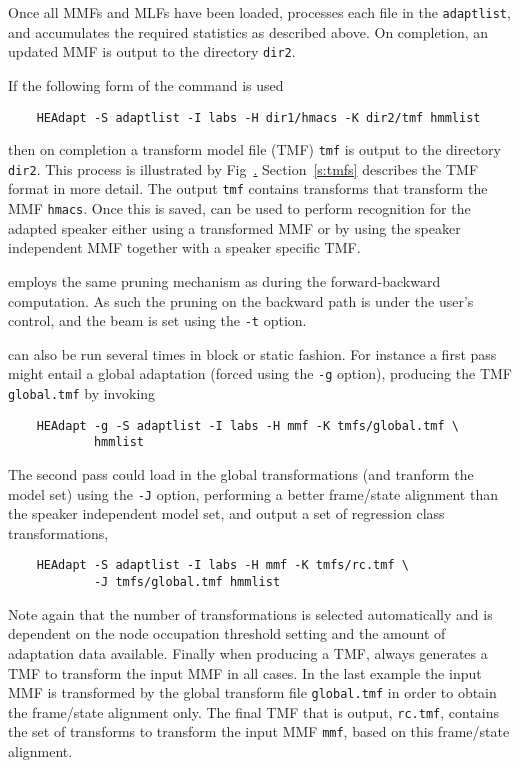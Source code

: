 Once all MMFs and MLFs have been loaded, 
 processes each file in the
\texttt{adaptlist}, and accumulates the required statistics as described
above.  On completion, an updated  MMF is output to the directory
\texttt{dir2}.

If the following form of the command  is used
\begin{verbatim}
    HEAdapt -S adaptlist -I labs -H dir1/hmacs -K dir2/tmf hmmlist
\end{verbatim}
then on completion a transform model file (TMF) \texttt{tmf} is 
output to the directory \texttt{dir2}.
This process is illustrated by Fig~\href{f:headaptrdp}.
Section~\ref{s:tmfs} describes the TMF format in more
detail. The output \texttt{tmf} contains transforms that transform the
MMF \texttt{hmacs}.
Once this is saved,  can be used to perform recognition
for the adapted speaker either using a transformed MMF or by using the
speaker independent MMF together with a speaker specific TMF.

 employs the same pruning mechanism as 
during the forward-backward computation. As such the pruning on the
backward path is under the user's control, and the beam is set
using the \texttt{-t} option.

 can also be run several times in block or static
fashion. For instance a first pass
might entail a global adaptation (forced using the \texttt{-g} option), 
producing the TMF \texttt{global.tmf} by invoking
\begin{verbatim}
    HEAdapt -g -S adaptlist -I labs -H mmf -K tmfs/global.tmf \ 
            hmmlist
\end{verbatim}
The second pass could load in the global transformations (and tranform
the model set) using the \texttt{-J} option, performing a better 
frame/state alignment than the speaker independent model set, 
and output a set of regression class transformations,
\begin{verbatim}
    HEAdapt -S adaptlist -I labs -H mmf -K tmfs/rc.tmf \
            -J tmfs/global.tmf hmmlist
\end{verbatim}
Note again that the number of transformations is selected
automatically and is
dependent on the node occupation threshold setting and the amount of
adaptation data available. Finally when producing a TMF, 
always generates a TMF to transform the input MMF in all cases. 
In the last example the input MMF is 
transformed by the global transform file \texttt{global.tmf} in order 
to obtain the frame/state alignment only. The final TMF that is output, 
\texttt{rc.tmf}, contains the set of transforms to transform the input
MMF \texttt{mmf}, based on this frame/state alignment.


